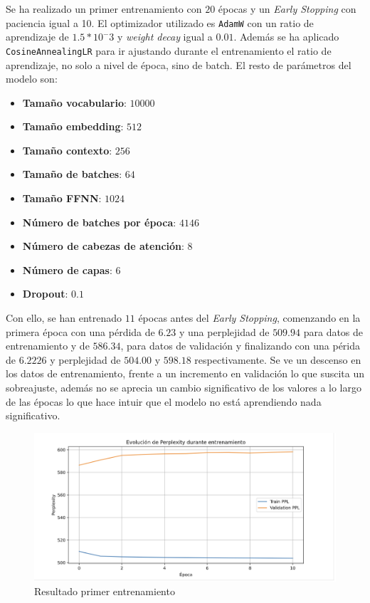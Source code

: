 \documentclass[11pt]{book}
\begin{document}
Se ha realizado un primer entrenamiento con $20$ épocas y un \textit{Early Stopping} con paciencia igual a 10. El optimizador utilizado es \texttt{AdamW} con un ratio de aprendizaje de $1.5*10^-3$ y \textit{weight decay} igual a $0.01$. Además se ha aplicado \texttt{CosineAnnealingLR} para ir ajustando durante el entrenamiento el ratio de aprendizaje, no solo a nivel de época, sino de batch. El resto de parámetros del modelo son: 

\begin{itemize}
    \item \textbf{Tamaño vocabulario}: $10000$
    \item \textbf{Tamaño embedding}: $512$
    \item \textbf{Tamaño contexto}: $256$
    \item \textbf{Tamaño de batches}: $64$
    \item \textbf{Tamaño FFNN}: $1024$
    \item \textbf{Número de batches por época}: $4146$
    \item \textbf{Número de cabezas de atención}: $8$
    \item \textbf{Número de capas}: $6$
    \item \textbf{Dropout}: $0.1$
\end{itemize}

Con ello, se han entrenado $11$ épocas antes del \textit{Early Stopping}, comenzando en la primera época con una pérdida de $6.23$ y una perplejidad de  $509.94$ para datos de entrenamiento y de $586.34$, para datos de validación y finalizando con una périda de $6.2226$ y perplejidad de $504.00$ y $598.18$ respectivamente. Se ve un descenso en los datos de entrenamiento, frente a un incremento en validación lo que suscita un sobreajuste, además no se aprecia un cambio significativo de los valores a lo largo de las épocas lo que hace intuir que el modelo no está aprendiendo nada significativo.

\begin{figure}[h]
    \centering
    \includegraphics[width=0.5\linewidth]{img/resultado_entrenamiento_v1.png}
    \caption{Resultado primer entrenamiento}
    \label{fig:placeholder24}
\end{figure}
\end{document}
